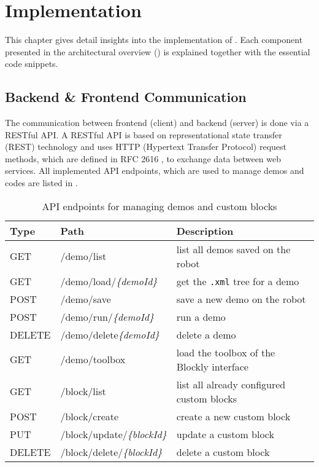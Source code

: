 \chapter{Implementation}
This chapter gives detail insights into the implementation of \toolname{}. Each component presented in the architectural overview () is explained together with the essential code snippets.

\section{Backend \& Frontend Communication}
The communication between frontend (client) and backend (server) is done via a RESTful API. A RESTful API is based on representational state transfer (REST) technology and uses HTTP (Hypertext Transfer Protocol) request methods, which are defined in RFC 2616 \cite{RFC2616}, to exchange data between web services. All implemented API endpoints, which are used to manage demos and codes are listed in .

\begin{table}[htbp]
	\centering
	\begin{tabular}{l l l}
		\toprule
		Type   & Path                               & Description                                     \\
		\midrule
		GET    & /demo/list                         & list all demos saved on the robot               \\
		GET    & /demo/load/\textit{\{demoId\}}     & get the \lstinline!.xml! tree for a demo        \\
		POST   & /demo/save                         & save a new demo on the robot                    \\
		POST   & /demo/run/\textit{\{demoId\}}      & run a demo                                      \\
		DELETE & /demo/delete\textit{\{demoId\}}    & delete a demo                                   \\
		GET    & /demo/toolbox                      & load the toolbox of the Blockly interface       \\
		GET    & /block/list                        & list all already configured custom blocks       \\
		POST   & /block/create                      & create a new custom block                       \\
		PUT    & /block/update/\textit{\{blockId\}} & update a custom block                           \\
		DELETE & /block/delete/\textit{\{blockId\}} & delete a custom block                           \\
		\bottomrule
	\end{tabular}
	\caption{API endpoints for managing demos and custom blocks}
	\label{tab:APIspec}
\end{table}

